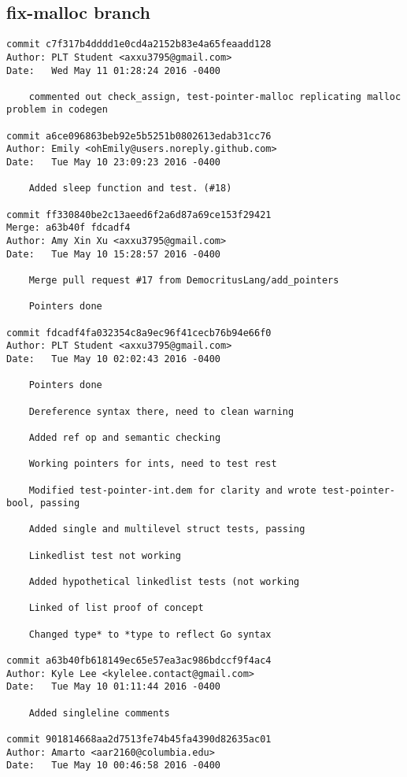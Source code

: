 \subsection{fix-malloc branch}
    \begin{lstlisting}[backgroundcolor=\color{white}]
commit c7f317b4dddd1e0cd4a2152b83e4a65feaadd128
Author: PLT Student <axxu3795@gmail.com>
Date:   Wed May 11 01:28:24 2016 -0400

    commented out check_assign, test-pointer-malloc replicating malloc problem in codegen

commit a6ce096863beb92e5b5251b0802613edab31cc76
Author: Emily <ohEmily@users.noreply.github.com>
Date:   Tue May 10 23:09:23 2016 -0400

    Added sleep function and test. (#18)

commit ff330840be2c13aeed6f2a6d87a69ce153f29421
Merge: a63b40f fdcadf4
Author: Amy Xin Xu <axxu3795@gmail.com>
Date:   Tue May 10 15:28:57 2016 -0400

    Merge pull request #17 from DemocritusLang/add_pointers
    
    Pointers done

commit fdcadf4fa032354c8a9ec96f41cecb76b94e66f0
Author: PLT Student <axxu3795@gmail.com>
Date:   Tue May 10 02:02:43 2016 -0400

    Pointers done
    
    Dereference syntax there, need to clean warning
    
    Added ref op and semantic checking
    
    Working pointers for ints, need to test rest
    
    Modified test-pointer-int.dem for clarity and wrote test-pointer-bool, passing
    
    Added single and multilevel struct tests, passing
    
    Linkedlist test not working
    
    Added hypothetical linkedlist tests (not working
    
    Linked of list proof of concept
    
    Changed type* to *type to reflect Go syntax

commit a63b40fb618149ec65e57ea3ac986bdccf9f4ac4
Author: Kyle Lee <kylelee.contact@gmail.com>
Date:   Tue May 10 01:11:44 2016 -0400

    Added singleline comments

commit 901814668aa2d7513fe74b45fa4390d82635ac01
Author: Amarto <aar2160@columbia.edu>
Date:   Tue May 10 00:46:58 2016 -0400


\end{lstlisting}
